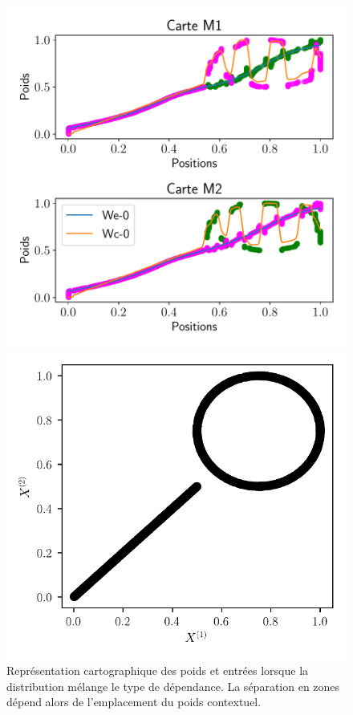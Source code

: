 \documentclass[../main]{subfiles}
\begin{document}
	\begin{figure}
		\begin{minipage}{0.6\textwidth}
			\includegraphics[width=\textwidth]{2som_mix_w.pdf}
		\end{minipage}
		\begin{minipage}{0.4\textwidth}
			\includegraphics[width=\textwidth]{2som_mix_in.pdf}
		\end{minipage}
		\caption{Représentation cartographique des poids et entrées lorsque la distribution mélange le type de dépendance. La séparation en zones dépend alors de l'emplacement du poids contextuel. \label{fig:mix_results}}
	\end{figure}
\end{document}
